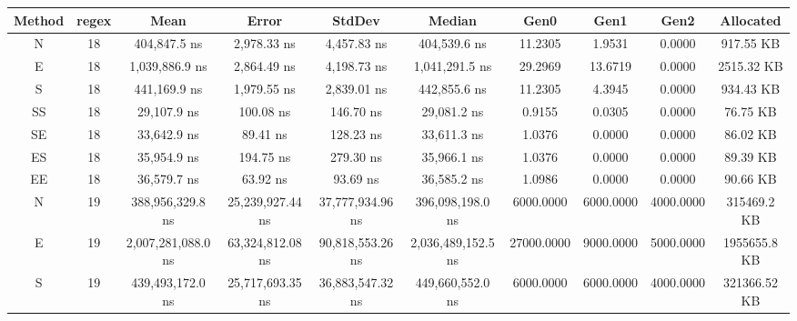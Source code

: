 \begin{sidewaystable}
    \begin{tabular}{|c|c|c|c|c|c|c|c|c|c|}
        \hline
        Method  &   regex   &   Mean                  &   Error             &   StdDev                &   Median                &   Gen0        &   Gen1        &   Gen2        &   Allocated        \\
        \hline
        N       &   18      &   404,847.5 ns          &   2,978.33 ns       &   4,457.83 ns           &   404,539.6 ns          &   11.2305     &   1.9531      &   0.0000      &   917.55 KB        \\
        E       &   18      &   1,039,886.9 ns        &   2,864.49 ns       &   4,198.73 ns           &   1,041,291.5 ns        &   29.2969     &   13.6719     &   0.0000      &   2515.32 KB       \\
        S       &   18      &   441,169.9 ns          &   1,979.55 ns       &   2,839.01 ns           &   442,855.6 ns          &   11.2305     &   4.3945      &   0.0000      &   934.43 KB        \\
        SS      &   18      &   29,107.9 ns           &   100.08 ns         &   146.70 ns             &   29,081.2 ns           &   0.9155      &   0.0305      &   0.0000      &   76.75 KB         \\
        SE      &   18      &   33,642.9 ns           &   89.41 ns          &   128.23 ns             &   33,611.3 ns           &   1.0376      &   0.0000      &   0.0000      &   86.02 KB         \\
        ES      &   18      &   35,954.9 ns           &   194.75 ns         &  279.30 ns              &   35,966.1 ns           &   1.0376      &   0.0000      &   0.0000      &   89.39 KB         \\
        EE      &   18      &   36,579.7 ns           &   63.92 ns          &   93.69 ns              &   36,585.2 ns           &   1.0986      &   0.0000      &   0.0000      &   90.66 KB         \\
        N       &   19      &   388,956,329.8 ns      &   25,239,927.44 ns  &   37,777,934.96 ns      &   396,098,198.0 ns      &   6000.0000   &   6000.0000   &   4000.0000   &   315469.2 KB      \\
        E       &   19      &   2,007,281,088.0 ns    &   63,324,812.08 ns  &   90,818,553.26 ns      &   2,036,489,152.5 ns    &   27000.0000  &   9000.0000   &   5000.0000   &   1955655.8 KB     \\
        S       &   19      &   439,493,172.0 ns      &   25,717,693.35 ns  &   36,883,547.32 ns      &   449,660,552.0 ns      &   6000.0000   &   6000.0000   &   4000.0000   &   321366.52 KB     \\

\end{tabular}
\end{sidewaystable}
